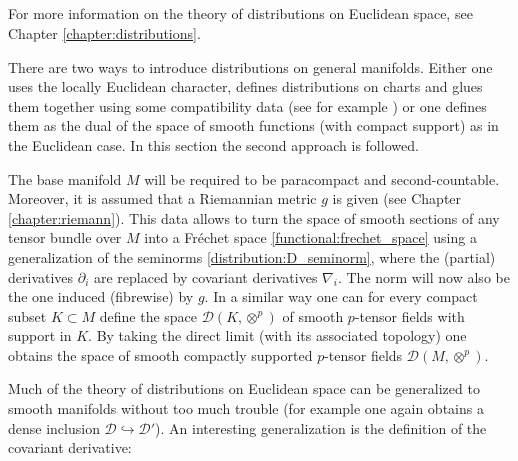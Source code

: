 \subsection{}

    For more information on the theory of distributions on Euclidean space, see Chapter \ref{chapter:distributions}.

    There are two ways to introduce distributions on general manifolds. Either one uses the locally Euclidean character, defines distributions on charts and glues them together using some compatibility data (see for example \cite{AMP1}) or one defines them as the dual of the space of smooth functions (with compact support) as in the Euclidean case. In this section the second approach is followed.

    The base manifold $M$ will be required to be paracompact and second-countable. Moreover, it is assumed that a Riemannian metric $g$ is given (see Chapter \ref{chapter:riemann}). This data allows to turn the space of smooth sections of any tensor bundle over $M$ into a Fr\'echet space \ref{functional:frechet_space} using a generalization of the seminorms \eqref{distribution:D_seminorm}, where the (partial) derivatives $\partial_i$ are replaced by covariant derivatives $\nabla_i$. The norm will now also be the one induced (fibrewise) by $g$. In a similar way one can for every compact subset $K\subset M$ define the space $\mathcal{D}(K,\otimes^p)$ of smooth $p$-tensor fields with support in $K$. By taking the direct limit (with its associated topology) one obtains the space of smooth compactly supported $p$-tensor fields $\mathcal{D}(M,\otimes^p)$.


    Much of the theory of distributions on Euclidean space can be generalized to smooth manifolds without too much trouble (for example one again obtains a dense inclusion $\mathcal{D}\hookrightarrow\mathcal{D}'$). An interesting generalization is the definition of the covariant derivative:

